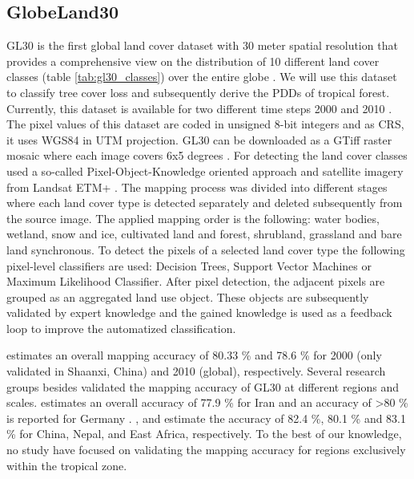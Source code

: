 	\subsection{GlobeLand30}
		\ac{GL30} is the first global land cover dataset with 30 meter spatial resolution that provides a comprehensive view on the distribution of 10 different land cover classes (table \ref{tab:gl30_classes}) over the entire globe \citep{Chen2017}. We will use this dataset to classify tree cover loss and subsequently derive the \acp{PDD} of tropical forest. Currently, this dataset is available for two different time steps 2000 and 2010 \citep{Chen2015}. The pixel values of this dataset are coded in unsigned 8-bit integers and as \ac{CRS}, it uses \ac{WGS84} in \ac{UTM} projection. \ac{GL30} can be downloaded as a \ac{GTiff} raster mosaic where each image covers 6x5 degrees \citep{Chen2014}. For detecting the land cover classes \citeauthor{Chen2015} used a so-called Pixel-Object-Knowledge oriented approach and satellite imagery from Landsat ETM+ \citep{Chen2015}. The mapping process was divided into different stages where each land cover type is detected separately and deleted subsequently from the source image. The applied mapping order is the following: water bodies, wetland, snow and ice, cultivated land and forest, shrubland, grassland and bare land synchronous. To detect the pixels of a selected land cover type the following pixel-level classifiers are used: Decision Trees, Support Vector Machines or Maximum Likelihood Classifier. After pixel detection, the adjacent pixels are grouped as an aggregated land use object. These objects are subsequently validated by expert knowledge and the gained knowledge is used as a feedback loop to improve the automatized classification.

		\citet{Chen2015} estimates an overall mapping accuracy of 80.33 \% and 78.6 \% for 2000 (only validated in Shaanxi, China) and 2010 (global), respectively. Several research groups besides \citeauthor{Chen2015} validated the mapping accuracy of \ac{GL30} at different regions and scales. \citeauthor{Arsanjani2016} estimates an overall accuracy of 77.9 \% for Iran and an accuracy of >80 \% is reported for Germany \citep{Arsanjani2016a,Arsanjani2016}. \citet{Yang2017}, \citet{Cao2016} and \citet{Jacobson2015} estimate the accuracy of 82.4 \%, 80.1 \% and 83.1 \% for China, Nepal, and East Africa, respectively. To the best of our knowledge, no study have focused on validating the mapping accuracy for regions exclusively within the tropical zone.

